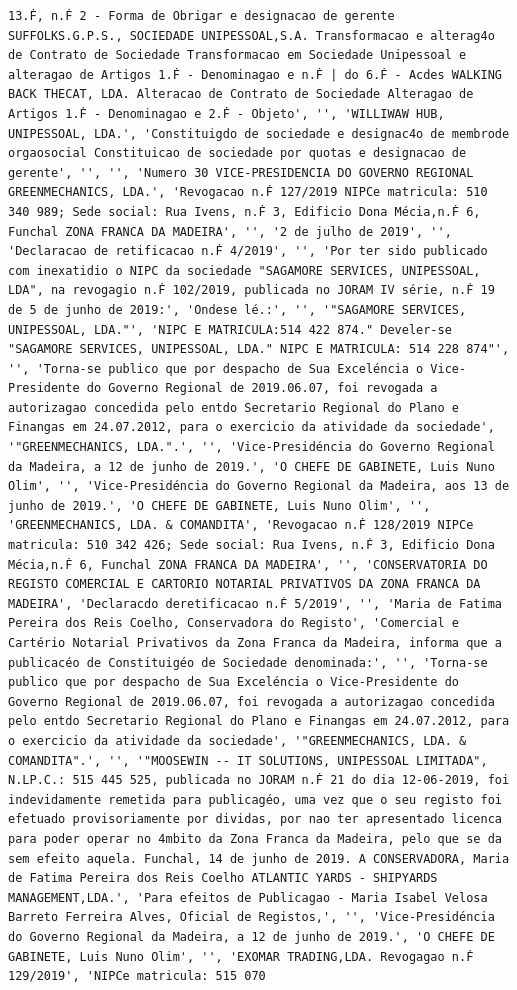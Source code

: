 \documentclass[
  12pt,
]{article}
\begin{document}
\begin{verbatim}
13.Ḟ, n.Ḟ 2 - Forma de Obrigar e designacao de gerente SUFFOLKS.G.P.S., SOCIEDADE UNIPESSOAL,S.A. Transformacao e alterag4o de Contrato de Sociedade Transformacao em Sociedade Unipessoal e alteragao de Artigos 1.Ḟ - Denominagao e n.Ḟ | do 6.Ḟ - Acdes WALKING BACK THECAT, LDA. Alteracao de Contrato de Sociedade Alteragao de Artigos 1.Ḟ - Denominagao e 2.Ḟ - Objeto', '', 'WILLIWAW HUB, UNIPESSOAL, LDA.', 'Constituigdo de sociedade e designac4o de membrode orgaosocial Constituicao de sociedade por quotas e designacao de gerente', '', '', 'Numero 30 VICE-PRESIDENCIA DO GOVERNO REGIONAL GREENMECHANICS, LDA.', 'Revogacao n.Ḟ 127/2019 NIPCe matricula: 510 340 989; Sede social: Rua Ivens, n.Ḟ 3, Edificio Dona Mécia,n.Ḟ 6, Funchal ZONA FRANCA DA MADEIRA', '', '2 de julho de 2019', '', 'Declaracao de retificacao n.Ḟ 4/2019', '', 'Por ter sido publicado com inexatidio o NIPC da sociedade "SAGAMORE SERVICES, UNIPESSOAL, LDA", na revogagio n.Ḟ 102/2019, publicada no JORAM IV série, n.Ḟ 19 de 5 de junho de 2019:', 'Ondese lé.:', '', '"SAGAMORE SERVICES, UNIPESSOAL, LDA."', 'NIPC E MATRICULA:514 422 874." Develer-se "SAGAMORE SERVICES, UNIPESSOAL, LDA." NIPC E MATRICULA: 514 228 874"', '', 'Torna-se publico que por despacho de Sua Exceléncia o Vice-Presidente do Governo Regional de 2019.06.07, foi revogada a autorizagao concedida pelo entdo Secretario Regional do Plano e Finangas em 24.07.2012, para o exercicio da atividade da sociedade', '"GREENMECHANICS, LDA.".', '', 'Vice-Presidéncia do Governo Regional da Madeira, a 12 de junho de 2019.', 'O CHEFE DE GABINETE, Luis Nuno Olim', '', 'Vice-Presidéncia do Governo Regional da Madeira, aos 13 de junho de 2019.', 'O CHEFE DE GABINETE, Luis Nuno Olim', '', 'GREENMECHANICS, LDA. & COMANDITA', 'Revogacao n.Ḟ 128/2019 NIPCe matricula: 510 342 426; Sede social: Rua Ivens, n.Ḟ 3, Edificio Dona Mécia,n.Ḟ 6, Funchal ZONA FRANCA DA MADEIRA', '', 'CONSERVATORIA DO REGISTO COMERCIAL E CARTORIO NOTARIAL PRIVATIVOS DA ZONA FRANCA DA MADEIRA', 'Declaracdo deretificacao n.Ḟ 5/2019', '', 'Maria de Fatima Pereira dos Reis Coelho, Conservadora do Registo', 'Comercial e Cartério Notarial Privativos da Zona Franca da Madeira, informa que a publicacéo de Constituigéo de Sociedade denominada:', '', 'Torna-se publico que por despacho de Sua Exceléncia o Vice-Presidente do Governo Regional de 2019.06.07, foi revogada a autorizagao concedida pelo entdo Secretario Regional do Plano e Finangas em 24.07.2012, para o exercicio da atividade da sociedade', '"GREENMECHANICS, LDA. & COMANDITA".', '', '"MOOSEWIN -- IT SOLUTIONS, UNIPESSOAL LIMITADA", N.LP.C.: 515 445 525, publicada no JORAM n.Ḟ 21 do dia 12-06-2019, foi indevidamente remetida para publicagéo, uma vez que o seu registo foi efetuado provisoriamente por dividas, por nao ter apresentado licenca para poder operar no 4mbito da Zona Franca da Madeira, pelo que se da sem efeito aquela. Funchal, 14 de junho de 2019. A CONSERVADORA, Maria de Fatima Pereira dos Reis Coelho ATLANTIC YARDS - SHIPYARDS MANAGEMENT,LDA.', 'Para efeitos de Publicagao - Maria Isabel Velosa Barreto Ferreira Alves, Oficial de Registos,', '', 'Vice-Presidéncia do Governo Regional da Madeira, a 12 de junho de 2019.', 'O CHEFE DE GABINETE, Luis Nuno Olim', '', 'EXOMAR TRADING,LDA. Revogagao n.Ḟ 129/2019', 'NIPCe matricula: 515 070 
\end{verbatim}
\end{document}

